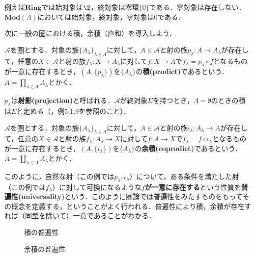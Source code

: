 例えば$\mathbf{Ring}$では始対象は$\Z$，終対象は零環$\{0\}$である．零対象は存在しない．$\mathbf{Mod}(A)$においては始対象，終対象，零対象は$0$である．

次に一般の圏における積，余積（直和）を導入しよう．

\begin{defi}[積]
	$\mathscr{A}$を圏とする．対象の族$\{A_\lambda\}_{\lambda\in\Lambda}$に対して，$A\in\mathscr{A}$と射の族$p_\lambda:A\to A_\lambda$が存在して，任意の$X\in\mathscr{A}$と射の族$f_\lambda:X\to A_\lambda$に対して$f:X\to A$で$f_\lambda=p_\lambda\circ f$となるものが一意に存在するとき，$(A,\{p_\lambda\})$を$\{A_\lambda\}$の\textbf{積(prodict)}であるという．$A=\prod_{\lambda\in\Lambda}A_\lambda$とかく．
\end{defi}

$p_\lambda$は\textbf{射影(projection)}と呼ばれる．$\mathscr{A}$が終対象$E$を持つとき，$\Lambda=\emptyset$のときの積は$E$と定める（\cite{Leinster2014}，例5.1.9を参照のこと）．

\begin{defi}[余積]
	$\mathscr{A}$を圏とする．対象の族$\{A_\lambda\}_{\lambda\in\Lambda}$に対して，$A\in\mathscr{A}$と射の族$\iota_\lambda:A_\lambda\to A$が存在して，任意の$X\in\mathscr{A}$と射の族$f_\lambda:A_\lambda\to X$に対して$f:A\to X$で$f_\lambda=f\circ \iota_\lambda$となるものが一意に存在するとき，$(A,\{\iota_\lambda\})$を$\{A_\lambda\}$の\textbf{余積(coprodict)}であるという．$A=\coprod_{\lambda\in\Lambda}A_\lambda$とかく．
\end{defi}


このように，自然な射（この例では$p_\lambda,\iota_\lambda$）について，ある条件を満たした射（この例では$f_\lambda$）に対して可換になるような\textbf{$f$が一意に存在する}という性質を\textbf{普遍性(universality)}という．このように圏論では普遍性をみたすものをもってその概念を定義する，ということがよく行われる．普遍性により積，余積が存在すれば（同型を除いて）一意であることがわかる．

\begin{minipage}{.45\textwidth}
	\begin{figure}[H]
		\centering
		\caption{積の普遍性}
	\end{figure}
\end{minipage}
\hfill
\begin{minipage}{.45\textwidth}
	\begin{figure}[H]
		\centering
		\caption{余積の普遍性}
	\end{figure}
\end{minipage}


